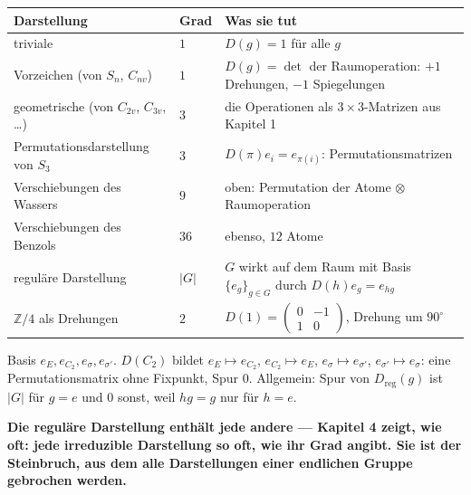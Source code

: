 \begin{merksatz}
\begin{center}
{\small
\renewcommand{\arraystretch}{1.5}
\begin{tabular}{@{}P{3.2cm}P{0.9cm}P{4.5cm}@{}}
\toprule
\textbf{Darstellung} & \textbf{Grad} & \textbf{Was sie tut}\\
\midrule
triviale & $1$ & $D(g) = 1$ für alle $g$\\
Vorzeichen (von $S_n$, $C_{nv}$) & $1$ & $D(g) = \det$ der Raumoperation: $+1$ Drehungen, $-1$ Spiegelungen\\
geometrische (von $C_{2v}$, $C_{3v}$, \ldots) & $3$ & die Operationen als $3\times3$-Matrizen aus Kapitel 1\\
Permutations\-darstellung von $S_3$ & $3$ & $D(\pi)e_i = e_{\pi(i)}$: Permutationsmatrizen\\
Verschiebungen des Wassers & $9$ & oben: Permutation der Atome $\otimes$ Raumoperation\\
Verschiebungen des Benzols & $36$ & ebenso, $12$ Atome\\
reguläre Darstellung & $|G|$ & $G$ wirkt auf dem Raum mit Basis $\{e_g\}_{g\in G}$ durch $D(h)e_g = e_{hg}$\\
$\mathbb Z/4$ als Drehungen & $2$ & $D(1) = \begin{pmatrix}0 & -1\\ 1 & 0\end{pmatrix}$, Drehung um $90^{\circ}$\\
\bottomrule
\end{tabular}}
\end{center}

Basis $e_E, e_{C_2}, e_{\sigma}, e_{\sigma'}$. $D(C_2)$ bildet $e_E\mapsto e_{C_2}$, $e_{C_2}\mapsto e_E$, $e_\sigma\mapsto e_{\sigma'}$, $e_{\sigma'}\mapsto e_\sigma$: eine Permutationsmatrix ohne Fixpunkt, Spur $0$. Allgemein: Spur von $D_{\mathrm{reg}}(g)$ ist $|G|$ für $g = e$ und $0$ sonst, weil $hg = g$ nur für $h = e$.

\begin{center}
\begin{minipage}{0.9\textwidth}
\textbf{Die reguläre Darstellung enthält jede andere --- Kapitel 4 zeigt, wie oft: jede irreduzible Darstellung so oft, wie ihr Grad angibt. Sie ist der Steinbruch, aus dem alle Darstellungen einer endlichen Gruppe gebrochen werden.}
\end{minipage}
\end{center}


\end{merksatz}
